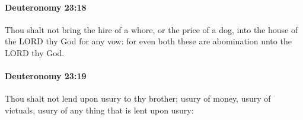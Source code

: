 		\paragraph{Deuteronomy 23:18} %
			\label{DEUTERONOMY-23-18}

			Thou shalt not bring the hire of a whore, or the price of a dog, into the house of the LORD thy God for any vow: for even both these are abomination unto the LORD thy God.


		\paragraph{Deuteronomy 23:19} %
			\label{DEUTERONOMY-23-19}

			Thou shalt not lend upon usury to thy brother; usury of money, usury of victuals, usury of any thing that is lent upon usury:


